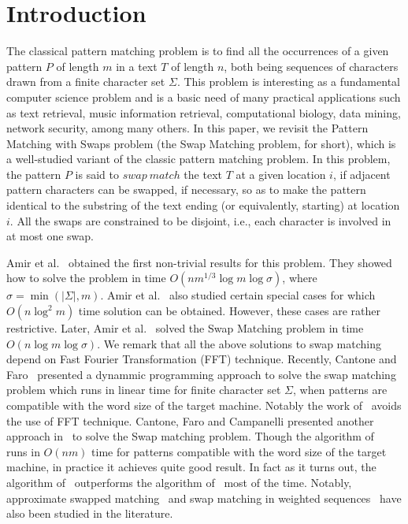 \documentclass{llncs}
\begin{document}
\section{\label{intro}Introduction}
The classical pattern matching problem is to find all the occurrences of a given pattern $P$ of length $m$ in a text $T$ of length $n$, both being sequences of characters drawn from a finite character set $\Sigma$. This problem is interesting as a fundamental computer science problem and is a basic need of many practical applications such as text retrieval, music information retrieval, computational biology, data mining, network security, among many others. In this paper, we revisit the Pattern Matching with Swaps problem (the Swap Matching problem, for short), which is a well-studied variant of the classic pattern matching problem. In this problem, the pattern $P$ is said to $swap~match$ the text $T$ at a given location $i$, if adjacent pattern characters can be swapped, if necessary, so as to make the pattern identical to the substring of the text ending (or equivalently, starting) at location $i$. All the swaps are constrained to be disjoint, i.e., each character is involved in at most one swap. 


Amir et al.~\cite{DBLP:journals/jal/AmirALLL00} obtained the first non-trivial results for this problem. They showed how to solve the problem in time $O(nm^{1/3} \log m\log\sigma)$, where $\sigma = \min(|\Sigma|,m)$. Amir et al.~\cite{DBLP:journals/ipl/AmirLLL98} also studied certain special cases for which $O(n \log^2 m)$ time solution can be obtained. However, these cases are rather restrictive. Later, Amir et al.~\cite{DBLP:journals/iandc/AmirCHLP03} solved the Swap Matching problem in time $O(n\log m\log\sigma)$. We remark that all the above solutions to swap matching depend on Fast Fourier Transformation (FFT) technique. Recently, Cantone and Faro~\cite{CS} presented a dynammic programming approach to solve the swap matching problem which runs in linear time for finite character set $\Sigma$, when patterns are compatible with the word size of the target machine. Notably the work of~\cite{CS} avoids the use of FFT technique. Cantone, Faro and Campanelli presented another approach in~\cite{CCS} to solve the Swap matching problem. Though the algorithm of~\cite{CCS} runs in $O(nm)$ time for patterns compatible with the word size of the target machine, in practice it achieves quite good result. In fact as it turns out, the algorithm of~\cite{CCS} outperforms the algorithm of~\cite{CS} most of the time.  
Notably, approximate swapped matching~\cite{DBLP:journals/ipl/AmirLP02} and swap matching in weighted sequences~\cite{DBLP:conf/cis/ZhangGI04} have also been studied in the literature.
\end{document}
